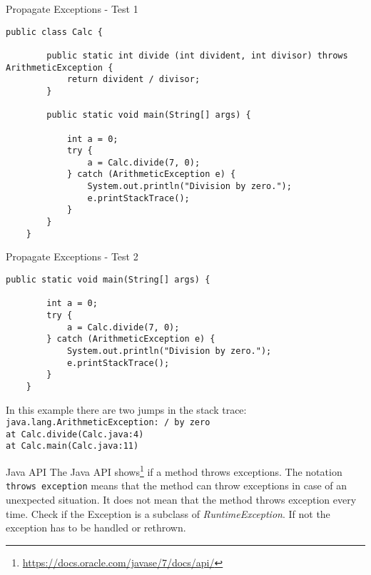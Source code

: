 \begin{frame}[fragile]{Propagate Exceptions - Test 1}
    \begin{lstlisting}[basicstyle=\ttfamily\scriptsize]
    public class Calc {
    
        public static int divide (int divident, int divisor) throws ArithmeticException {
            return divident / divisor;
        }
    
        public static void main(String[] args) {
    
            int a = 0;
            try {
                a = Calc.divide(7, 0);
            } catch (ArithmeticException e) {
                System.out.println("Division by zero.");
                e.printStackTrace();
            }
        }
    }
    \end{lstlisting}
\end{frame}

\begin{frame}[fragile]{Propagate Exceptions - Test 2}
    \begin{lstlisting}[basicstyle=\ttfamily\scriptsize, firstnumber=7]
    public static void main(String[] args) {
    
        int a = 0;
        try {
            a = Calc.divide(7, 0);
        } catch (ArithmeticException e) {
            System.out.println("Division by zero.");
            e.printStackTrace();
        }
    }
    \end{lstlisting}
    In this example there are two jumps in the stack trace:\\
    \texttt{java.lang.ArithmeticException: / by zero}\\
    \texttt{at Calc.divide(Calc.java:4)}\\
    \texttt{at Calc.main(Calc.java:11)}
\end{frame}

\begin{frame}{Java API}
    The Java API shows\footnote{\scriptsize\url{https://docs.oracle.com/javase/7/docs/api/}}
    if a method throws exceptions. 
    The notation \texttt{throws exception} means that the method can throw 
    exceptions in case of an unexpected situation.
    It does not mean that the method throws exception every time.
    \vfill
    Check if the Exception is a subclass of \emph{RuntimeException}. 
    If not the exception has to be handled or rethrown.
\end{frame}


